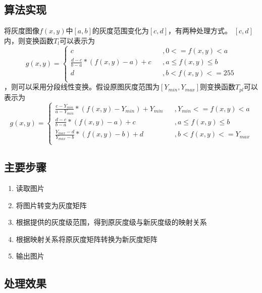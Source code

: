 \documentclass[UTF8]{ctexart}
\begin{document}
		\subsection{算法实现}
		将灰度图像$f(x,y)$中$[a,b]$的灰度范围变化为$[c,d]$，有两种处理方式。\newline
		$[c,d]$内，则变换函数$T_l$可以表示为
		\[
		g(x,y)=\left\{
		\begin{array}{lcl}
		c & & ,{0 <= f(x,y) < a} \\
		\frac{d-c}{b-a} * (f(x,y)-a) + c & & ,{a \leq f(x,y) \leq b} \\
		d & & ,{b < f(x,y) <= 255} \\
		\end{array}\right.
		\]
		，则可以采用分段线性变换。假设原图灰度范围为$[Y_{min},Y_{max}]$则变换函数$T_{pl}$可以表示为
		\[
		g(x,y)=\left\{
		\begin{array}{lcl}
		\frac{c-Y_{min}}{a-Y_{min}} * (f(x,y)-Y_{min}) + Y_{min} & & ,{Y_{min} <= f(x,y) < a} \\
		\frac{d-c}{b-a} * (f(x,y)-a) + c & & ,{a \leq f(x,y) \leq b} \\
		\frac{Y_{max}-d}{Y_{max}-b} * (f(x,y)-b) + d & & ,{b < f(x,y) <= Y_{max}} \\
		\end{array}\right.
		\]

		\subsection{主要步骤}
			\begin{enumerate} [(1)]
				\item 读取图片
				\item 将图片转变为灰度矩阵
				\item 根据提供的灰度级范围，得到原灰度级与新灰度级的映射关系
				\item 根据映射关系将原灰度矩阵转换为新灰度矩阵
				\item 输出图片
			\end{enumerate}


		\subsection{处理效果}
\end{document}
